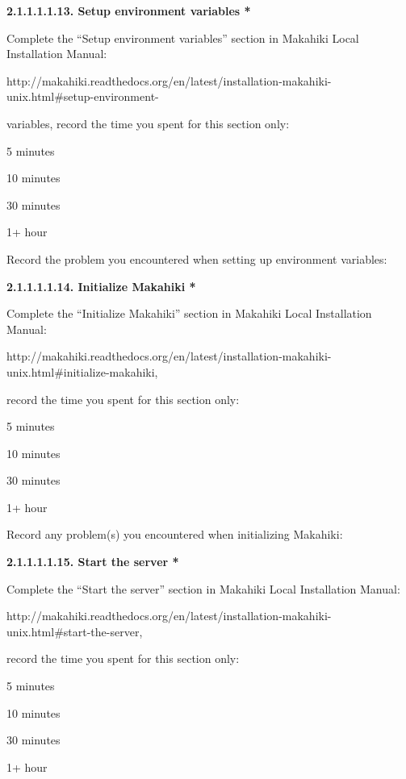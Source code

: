 {\bf 2.1.1.1.1.13. Setup environment variables *}

Complete the ``Setup environment variables'' section in Makahiki Local Installation Manual:

http://makahiki.readthedocs.org/en/latest/installation-makahiki-unix.html\#setup-environment-

variables,  record the time you spent for this section only:

\begin{radiobutton}
\item 5 minutes
\item  10 minutes
\item  30 minutes
\item  1+ hour
\end{radiobutton}

Record the problem you encountered when setting up environment variables: \underline{\hspace{3cm}}

{\bf 2.1.1.1.1.14. Initialize Makahiki *}

Complete the ``Initialize Makahiki'' section in Makahiki Local Installation Manual:

http://makahiki.readthedocs.org/en/latest/installation-makahiki-unix.html\#initialize-makahiki, 

record the time you spent for this section only:

\begin{radiobutton}
\item 5 minutes
\item  10 minutes
\item  30 minutes
\item  1+ hour
\end{radiobutton}

Record any problem(s) you encountered when initializing Makahiki: \underline{\hspace{4cm}}

{\bf 2.1.1.1.1.15. Start the server *}

Complete the ``Start the server'' section in Makahiki Local Installation Manual:

http://makahiki.readthedocs.org/en/latest/installation-makahiki-unix.html\#start-the-server, 

record the time you spent for this section only:

\begin{radiobutton}
\item 5 minutes
\item  10 minutes
\item  30 minutes
\item  1+ hour
\end{radiobutton}

